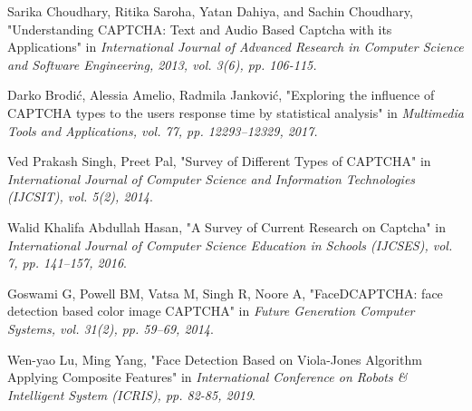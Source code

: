 \begin{thebibliography}{9}





Sarika Choudhary, Ritika Saroha, Yatan Dahiya, and Sachin Choudhary, "Understanding CAPTCHA: Text and Audio Based Captcha with its Applications" in \emph{International Journal of Advanced Research in Computer Science and Software Engineering, 2013, vol. 3(6), pp. 106-115.}

Darko Brodi\'c, Alessia Amelio, Radmila Jankovi\'c, "Exploring the influence of CAPTCHA types to the users response time by statistical analysis" in \emph{Multimedia Tools and Applications, vol. 77, pp. 12293–12329, 2017.}

Ved Prakash Singh, Preet Pal, "Survey of Different Types of CAPTCHA" in \emph{International Journal of Computer Science and Information Technologies (IJCSIT), vol. 5(2), 2014}.

Walid Khalifa Abdullah Hasan, "A Survey of Current Research on Captcha" in \emph{International Journal of Computer Science Education in Schools (IJCSES), vol. 7, pp. 141–157, 2016}.

Goswami G, Powell BM, Vatsa M, Singh R, Noore A, "FaceDCAPTCHA: face detection based color image CAPTCHA" in \emph{Future Generation Computer Systems, vol. 31(2), pp. 59–69, 2014}.

Wen-yao Lu, Ming Yang, "Face Detection Based on Viola-Jones Algorithm Applying Composite Features" in \emph{International Conference on Robots \& Intelligent System (ICRIS), pp. 82-85, 2019}.


\end{thebibliography}

